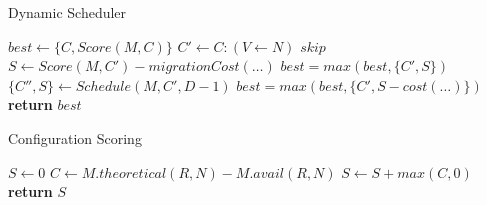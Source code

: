
\begin{algorithm}[h]
\caption{Dynamic Scheduler}
\label{algo:sched}
\footnotesize
\begin{algorithmic}[1]
    \State $best \gets \{C,Score(M,C)\}$%
        \State $C' \gets C : (V \gets N)$
            \State $skip$
        \EndIf
        \State $S \gets Score(M,C') - migrationCost(\dots)$
        \State $best = max(best,\{C',S\})$
        \State $\{C'',S\} \gets Schedule(M,C',D-1)$
        \State $best = max(best,\{C', S - cost(\dots)\})$
        \EndIf
    \EndFor
    \State \textbf{return} $best$
\EndProcedure
\end{algorithmic}
\normalsize
\end{algorithm}

\begin{algorithm}[h]
\caption{Configuration Scoring}
\label{algo:score}
\footnotesize
\begin{algorithmic}[1]
    \State $S \gets 0$
        \State $C \gets M.theoretical(R,N) - M.avail(R,N)$
        \State $S \gets S + max(C,0)$ \label{algo:scoremax}
    \EndFor
    \State \textbf{return} $S$
\EndProcedure
\end{algorithmic}
\normalsize
\end{algorithm}
